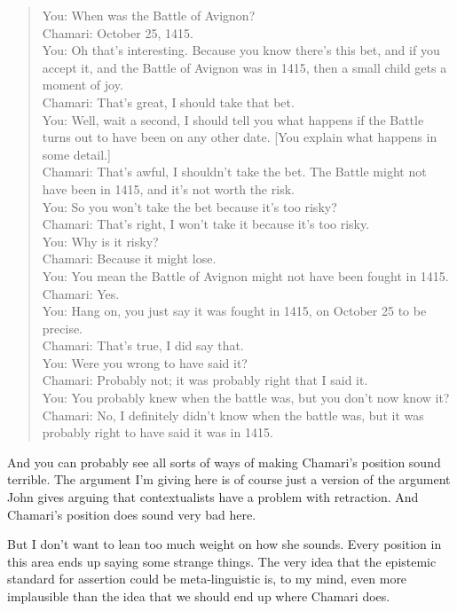 \documentclass[11pt,]{book}
\begin{document}
\begin{quote}
You: When was the Battle of Avignon?\\
Chamari: October 25, 1415.\\
You: Oh that's interesting. Because you know there's this bet, and if you accept it, and the Battle of Avignon was in 1415, then a small child gets a moment of joy.\\
Chamari: That's great, I should take that bet.\\
You: Well, wait a second, I should tell you what happens if the Battle turns out to have been on any other date. {[}You explain what happens in some detail.{]}\\
Chamari: That's awful, I shouldn't take the bet. The Battle might not have been in 1415, and it's not worth the risk.\\
You: So you won't take the bet because it's too risky?\\
Chamari: That's right, I won't take it because it's too risky.\\
You: Why is it risky?\\
Chamari: Because it might lose.\\
You: You mean the Battle of Avignon might not have been fought in 1415.\\
Chamari: Yes.\\
You: Hang on, you just say it was fought in 1415, on October 25 to be precise.\\
Chamari: That's true, I did say that.\\
You: Were you wrong to have said it?\\
Chamari: Probably not; it was probably right that I said it.\\
You: You probably knew when the battle was, but you don't now know it?\\
Chamari: No, I definitely didn't know when the battle was, but it was probably right to have said it was in 1415.
\end{quote}

And you can probably see all sorts of ways of making Chamari's position sound terrible. The argument I'm giving here is of course just a version of the argument John \citet{MacFarlane2005-Knowledge} gives arguing that contextualists have a problem with retraction. And Chamari's position does sound very bad here.

But I don't want to lean too much weight on how she sounds. Every position in this area ends up saying some strange things. The very idea that the epistemic standard for assertion could be meta-linguistic is, to my mind, even more implausible than the idea that we should end up where Chamari does.
\end{document}
